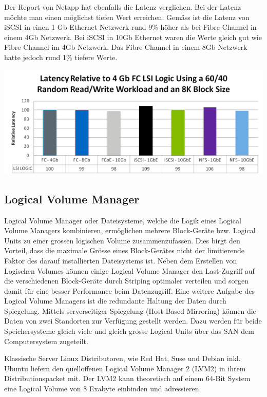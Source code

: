 Der Report von Netapp hat ebenfalls die Latenz verglichen. Bei der Latenz möchte man einen möglichst tiefen Wert erreichen. Gemäss  ist die Latenz von iSCSI in einen 1 Gb Ethernet Netzwerk rund 9\% höher als bei Fibre Channel in einem 4Gb Netzwerk. Bei iSCSI in 10Gb Ethernet waren die Werte gleich gut wie Fibre Channel im 4Gb Netzwerk. Das Fibre Channel in einem 8Gb Netzwerk hatte jedoch rund 1\% tiefere Werte.\cite{Jafri2011}

\begin{center}
\includegraphics[width=\linewidth, keepaspectratio = true]{media/netapp_latence.png}
\end{center}
 
\subsection{Logical Volume Manager}
Logical Volume Manager oder Dateisysteme, welche die Logik eines Logical Volume Managers kombinieren, ermöglichen mehrere Block-Geräte bzw. Logical Units zu einer grossen logischen Volume zusammenzufassen. Dies birgt den Vorteil, dass die maximale Grösse eines Block-Gerätes nicht der limitierende Faktor des darauf installierten Dateisystems ist. Neben dem Erstellen von Logischen Volumes können einige Logical Volume Manager den Last-Zugriff auf die verschiedenen Block-Geräte durch Striping optimaler verteilen und sorgen damit für eine besser Performance beim Datenzugriff. Eine weitere Aufgabe des Logical Volume Managers ist die redundante Haltung der Daten durch Spiegelung. Mittels serverseitiger Spiegelung (Host-Based Mirroring) können die Daten von zwei Standorten zur Verfügung gestellt werden. Dazu werden für beide Speichersysteme gleich viele und gleich grosse Logical Units über das SAN dem Computersystem zugeteilt.

Klassische Server Linux Distributoren, wie Red Hat, Suse und Debian inkl. Ubuntu liefern den quelloffenen Logical Volume Manager 2 (LVM2) in ihrem Distributionspacket mit. Der LVM2 kann theoretisch auf einem 64-Bit System eine Logical Volume von 8 Exabyte einbinden und adressieren.\cite{Levine2009}

